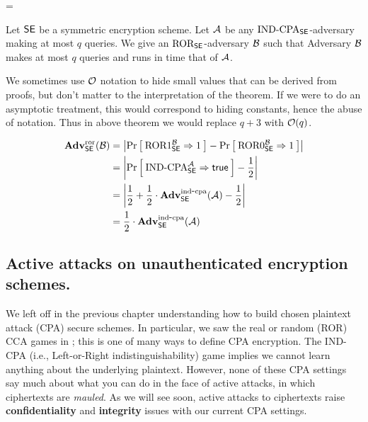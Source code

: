 \bnm
\AdvCTXT{\SE}{\advA} = \Prob{\CTXT_\SE^\advA\Rightarrow\true}\\
\enm


\begin{theorem}
Let ${\mathsf{SE}}$ be a symmetric encryption scheme. Let ${\mathcal A}$ be any
$\textnormal{IND-CPA}_{\mathsf{SE}}$-adversary making at most $q$ queries. 
We give an $\textnormal{ROR}_{\mathsf{SE}}$-adversary ${\mathcal B}$ such that
\bnm
  \AdvINDCPA{\SE}{\advA} \cdotsm\AdvROR{\SE}{\advB}
\enm
Adversary ${\mathcal B}$ makes at most $q$ 
queries and runs in time that of ${\mathcal A}$.
\label{theorem:ror-cpa}
\end{theorem}

We sometimes use ${\cal O}$ notation to hide small values that can be derived from
proofs, but don't matter to the interpretation of the theorem. If we were to do
an asymptotic treatment, this would correspond to hiding constants, hence the
abuse of notation.  Thus in above theorem we would replace $q+3$ with
${\cal O}(q)$. 



\begin{align*}
\mathbf{Adv}^{\mathrm{ror}}_{{\mathsf{SE}}}({\mathcal B}) 
    &= \left|\Pr\left[\: \textnormal{ROR}1_{\mathsf{SE}}^{\mathcal B}\Rightarrow 1 \:\right] -
                                \Pr\left[\: \textnormal{ROR}0_{\mathsf{SE}}^{\mathcal B}\Rightarrow 1 \:\right]\right|\\
    &= \left|\Pr\left[\: \textnormal{IND-CPA}_{\mathsf{SE}}^{\mathcal A}\Rightarrow\mathsf{true} \:\right] - \frac{1}{2}\right|\\
    &= \left|\frac{1}{2} +
    \frac{1}{2}\cdot\mathbf{Adv}^{\mathrm{ind\mbox{-} cpa}}_{{\mathsf{SE}}}({\mathcal A}) - \frac{1}{2}\right|\\
    &= \frac{1}{2}\cdot\mathbf{Adv}^{\mathrm{ind\mbox{-} cpa}}_{{\mathsf{SE}}}({\mathcal A})
\end{align*}





\subsection{Active attacks on unauthenticated encryption schemes.}
We left off in the previous chapter understanding how to build chosen plaintext attack (CPA) secure schemes. In particular, we saw the real or random (ROR) CCA games in ; this is one of many ways to define CPA encryption.
The IND-CPA (i.e., Left-or-Right indistinguishability) game implies we cannot learn anything about the underlying plaintext.
However, none of these CPA settings say much about what you can do in the face of active attacks, in which ciphertexts are \emph{mauled}. As we will see soon, active attacks to ciphertexts raise {\bf confidentiality} and {\bf integrity} issues with our current CPA settings.

